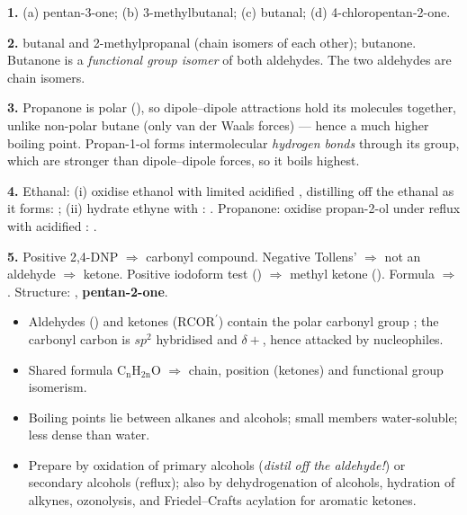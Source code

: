 \documentclass[11pt]{article}
\begin{document}
\begin{corrige}[Exercise 1]
\textbf{1.} (a) pentan-3-one; (b) 3-methylbutanal; (c) butanal; (d) 4-chloropentan-2-one.

\textbf{2.}  butanal and  2-methylpropanal (chain isomers of each other);  butanone. Butanone is a \emph{functional group isomer} of both aldehydes. The two aldehydes are chain isomers.

\textbf{3.} Propanone is polar (), so dipole–dipole attractions hold its molecules together, unlike non-polar butane (only van der Waals forces) — hence a much higher boiling point. Propan-1-ol forms intermolecular \emph{hydrogen bonds} through its  group, which are stronger than dipole–dipole forces, so it boils highest.

\textbf{4.} Ethanal: (i) oxidise ethanol with limited acidified , distilling off the ethanal as it forms: ; (ii) hydrate ethyne with : . Propanone: oxidise propan-2-ol under reflux with acidified : .

\textbf{5.} Positive 2,4-DNP $\Rightarrow$ carbonyl compound. Negative Tollens' $\Rightarrow$ not an aldehyde $\Rightarrow$ ketone. Positive iodoform test () $\Rightarrow$ methyl ketone (). Formula  $\Rightarrow$ . Structure: , \textbf{pentan-2-one}.
\end{corrige}

\begin{aretenir}
\begin{itemize}
\item Aldehydes () and ketones (\ensuremath{\mathrm{RCOR^{\prime}}}) contain the polar carbonyl group ; the carbonyl carbon is $sp^2$ hybridised and $\delta+$, hence attacked by nucleophiles.
\item Shared formula \ensuremath{\mathrm{C_nH_{2n}O}} $\Rightarrow$ chain, position (ketones) and functional group isomerism.
\item Boiling points lie between alkanes and alcohols; small members water-soluble; less dense than water.
\item Prepare by oxidation of primary alcohols (\emph{distil off the aldehyde!}) or secondary alcohols (reflux); also by dehydrogenation of alcohols, hydration of alkynes, ozonolysis, and Friedel–Crafts acylation for aromatic ketones.
\end{itemize}
\end{aretenir}
\end{document}
